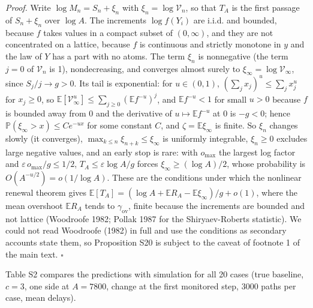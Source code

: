 \documentclass[
]{article}
\begin{document}
\emph{Proof.} Write \(\log M_n = S_n + \xi_n\) with
\(\xi_n = \log\mathcal{V}_n\), so that \(T_A\) is the first passage of
\(S_n + \xi_n\) over \(\log A\). The increments \(\log f(Y_i)\) are
i.i.d. and bounded, because \(f\) takes values in a compact subset of
\((0, \infty)\), and they are not concentrated on a lattice, because
\(f\) is continuous and strictly monotone in \(y\) and the law of \(Y\)
has a part with no atoms. The term \(\xi_n\) is nonnegative (the term
\(j = 0\) of \(\mathcal{V}_n\) is 1), nondecreasing, and converges
almost surely to \(\xi_\infty = \log\mathcal{V}_\infty\), since
\(S_j/j \to g > 0\). Its tail is exponential: for \(u \in (0, 1)\),
\((\sum_j x_j)^u \le \sum_j x_j^u\) for \(x_j \ge 0\), so
\(\mathbb{E}[\mathcal{V}_\infty^u] \le \sum_{j \ge 0}(\mathbb{E}f^{-u})^j\),
and \(\mathbb{E}f^{-u} < 1\) for small \(u > 0\) because \(f\) is
bounded away from 0 and the derivative of \(u \mapsto \mathbb{E}f^{-u}\)
at 0 is \(-g < 0\); hence \(\mathbb{P}(\xi_\infty > x) \le C e^{-u x}\)
for some constant \(C\), and \(\zeta = \mathbb{E}\xi_\infty\) is finite.
So \(\xi_n\) changes slowly (it converges),
\(\max_{k \le n}\xi_{n+k} \le \xi_\infty\) is uniformly integrable,
\(\xi_n \ge 0\) excludes large negative values, and an early stop is
rare: with \(o_{\max}\) the largest log factor and
\(\varepsilon\,o_{\max}/g \le 1/2\), \(T_A \le \varepsilon\log A/g\)
forces \(\xi_\infty \ge (\log A)/2\), whose probability is
\(O(A^{-u/2}) = o(1/\log A)\). These are the conditions under which the
nonlinear renewal theorem gives
\(\mathbb{E}[T_A] = (\log A + \mathbb{E}R_A - \mathbb{E}\xi_\infty)/g + o(1)\),
where the mean overshoot \(\mathbb{E}R_A\) tends to
\(\gamma_{\mathrm{ov}}\), finite because the increments are bounded and
not lattice (Woodroofe 1982; Pollak 1987 for the Shiryaev-Roberts
statistic). We could not read Woodroofe (1982) in full and use the
conditions as secondary accounts state them, so Proposition S20 is
subject to the caveat of footnote 1 of the main text. \(\square\)

Table S2 compares the predictions with simulation for all 20 cases (true
baseline, \(c = 3\), one side at \(A = 7800\), change at the first
monitored step, 3000 paths per case, mean delays).
\end{document}
